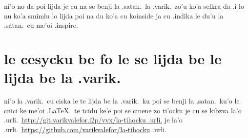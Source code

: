 \documentclass{article}
\begin{document}
ni'o no da poi lijda je cu na se benji la .satan.\ la .varik.\ zo'u ko'a selkra da .i lo nu ko'a smimlu lo lijda poi na du ko'a cu koinside ja cu .indika le du'u la .satan.\ cu me'oi .inspire.

\section{le cesycku be fo le se lijda be le lijda be la .varik.}
ni'o la .varik.\ cu ciska le te lijda be la .varik.\ ku poi se benji la .satan.\ ku'o le cnici ke me'oi .\LaTeX.\ te tcidu ke'e poi se cmene zo ti'ocku je cu se kibzva la'o .urli.\ \url{http://git.varikvalefor.i2p/vvx/la-tihocku .urli.} je la'o .urli.\ \url{https://github.com/varikvalefor/la-tihocku} .urli.
\end{document}
